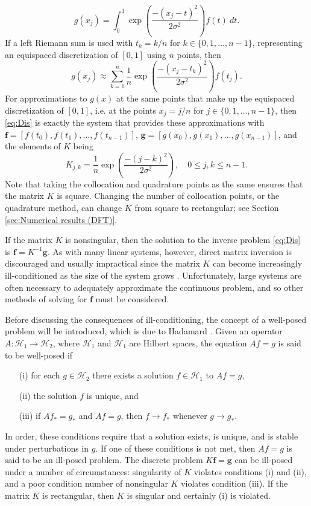 \documentclass[12pt,notitlepage]{report}
\newcommand{\gVec}{\mathbf{g}}	%
\newcommand{\kMat}{K}	%
\newcommand{\fVec}{\mathbf{f}}	%
\newcommand{\noiseSD}{\sigma}	%
\begin{document}
\[g(x_j) = \int_0^1 \exp\left(\frac{-(x_j - t)^2}{2\noiseSD^2}\right)f(t) \: dt.\]
If a left Riemann sum is used with $t_k = k/n$ for $k \in \{0,1,\ldots,n-1\}$, representing an equispaced discretization of $[0,1]$ using $n$ points, then
\[g(x_j) \approx \sum_{k=1}^n \frac{1}{n}\exp\left(\frac{-(x_j - t_k)^2}{2\noiseSD^2}\right)f(t_j).\]
For approximations to $g(x)$ at the same points that make up the equispaced discretization of $[0,1]$, i.e. at the points $x_j = j/n$ for $j \in \{0,1,\ldots,n-1\}$, then \eqref{eq:Dis} is exactly the system that provides these approximations with $\fVec = [f(t_0),f(t_1),\ldots,f(t_{n-1})]$, $\gVec = [g(x_0),g(x_1),\ldots,g(x_{n-1})]$, and the elements of $\kMat$ being
\[K_{j,k} = \frac{1}{n}\exp\left(\frac{-(j - k)^2}{2\noiseSD^2}\right), \quad 0 \leq j,k \leq n-1.\]
Note that taking the collocation and quadrature points as the same ensures that the matrix $\kMat$ is square. Changing the number of collocation points, or the quadrature method, can change $\kMat$ from square to rectangular; see Section \ref{sec:Numerical results (DFT)}. \par
If the matrix $\kMat$ is nonsingular, then the solution to the inverse problem \eqref{eq:Dis} is $\fVec = \kMat^{-1}\gVec$. As with many linear systems, however, direct matrix inversion is discouraged and usually impractical since the matrix $\kMat$ can become increasingly ill-conditioned as the size of the system grows \cite[p.~2]{Vogel:2002}. Unfortunately, large systems are often necessary to adequately approximate the continuous problem, and so other methods of solving for $\fVec$ must be considered. \par
Before discussing the consequences of ill-conditioning, the concept of a well-posed problem will be introduced, which is due to Hadamard \cite{Hadamard1904}. Given an operator $A : \mathcal{H}_1 \rightarrow \mathcal{H}_2$, where $\mathcal{H}_1$ and $\mathcal{H}_1$ are Hilbert spaces, the equation $Af = g$ is said to be well-posed if
\begin{enumerate}
\item[(i)] for each $g \in \mathcal{H}_2$ there exists a solution $f \in \mathcal{H}_1$ to $Af = g$,
\item[(ii)] the solution $f$ is unique, and
\item[(iii)] if $Af_* = g_*$ and $Af = g$, then $f \rightarrow f_*$ whenever $g \rightarrow g_*$.
\end{enumerate}
In order, these conditions require that a solution exists, is unique, and is stable under perturbations in $g$. If one of these conditions is not met, then $Af = g$ is said to be an ill-posed problem. The discrete problem $\kMat\fVec = \gVec$ can be ill-posed under a number of circumstances: singularity of $\kMat$ violates conditions (i) and (ii), and a poor condition number of nonsingular $\kMat$ violates condition (iii). If the matrix $\kMat$ is rectangular, then $\kMat$ is singular and certainly (i) is violated.  \par 
\end{document}
